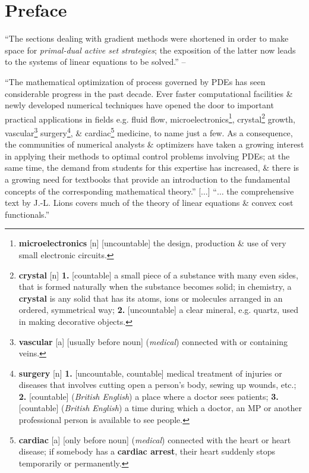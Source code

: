 \documentclass[oneside]{book}
\numberwithin{equation}{section}
\begin{document}
\section*{Preface}
``The sections dealing with gradient methods were shortened in order to make space for \textit{primal-dual active set strategies}; the exposition of the latter now leads to the systems of linear equations to be solved.'' -- \cite[Preface to the English edition, p. xi]{Troltzsch2010}

``The mathematical optimization of process governed by PDEs has seen considerable progress in the past decade. Ever faster computational facilities \& newly developed numerical techniques have opened the door to important practical applications in fields e.g. fluid flow, microelectronics\footnote{\textbf{microelectronics} [n] [uncountable] the design, production \& use of very small electronic circuits.}, crystal\footnote{\textbf{crystal} [n] \textbf{1.} [countable] a small piece of a substance with many even sides, that is formed naturally when the substance becomes solid; in chemistry, a \textbf{crystal} is any solid that has its atoms, ions or molecules arranged in an ordered, symmetrical way; \textbf{2.} [uncountable] a clear mineral, e.g. quartz, used in making decorative objects.} growth, vascular\footnote{\textbf{vascular} [a] [usually before noun] (\textit{medical}) connected with or containing veins.} surgery\footnote{\textbf{surgery} [n] \textbf{1.} [uncountable, countable] medical treatment of injuries or diseases that involves cutting open a person's body, sewing up wounds, etc.; \textbf{2.} [countable] (\textit{British English}) a place where a doctor sees patients; \textbf{3.} [countable] (\textit{British English}) a time during which a doctor, an MP or another professional person is available to see people.}, \& cardiac\footnote{\textbf{cardiac} [a] [only before noun] (\textit{medical}) connected with the heart or heart disease; if somebody has a \textbf{cardiac arrest}, their heart suddenly stops temporarily or permanently.} medicine, to name just a few. As a consequence, the communities of numerical analysts \& optimizers have taken a growing interest in applying their methods to optimal control problems involving PDEs; at the same time, the demand from students for this expertise has increased, \& there is a growing need for textbooks that provide an introduction to the fundamental concepts of the corresponding mathematical theory.'' [$\ldots$] ``$\ldots$ the comprehensive text by J.-L. Lions \cite{Lions1971} covers much of the theory of linear equations \& convex cost functionals.''
\end{document}
